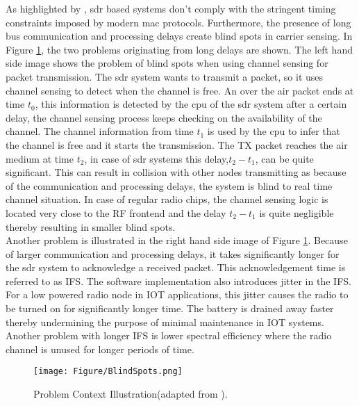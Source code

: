 As highlighted by \cite{schmid_experimental_2007}, \ac{sdr} based systems don't comply with the stringent timing constraints imposed by modern \ac{mac} protocols. Furthermore, the presence of long bus communication and processing delays create blind spots\cite{schmid_experimental_2007} in carrier sensing. 
In Figure \ref{blind_spots}, the two problems originating from long delays are shown.
The left hand side image shows the problem of blind spots when using channel sensing for packet transmission.
The \ac{sdr} system wants to transmit a packet, so it uses channel sensing to detect when the channel is free.
An over the air packet ends at time $t_0$, this information is detected by the \ac{cpu} of the \ac{sdr} system after a certain delay, the channel sensing process keeps checking on the availability of the channel.
The channel information from time $t_1$ is used by the \ac{cpu} to infer that the channel is free and it starts the transmission.
The TX packet reaches the air medium at time $t_2$, in case of \ac{sdr} systems this delay,$t_2-t_1$, can be quite significant.
This can result in collision with other nodes transmitting as because of the communication and processing delays, the system is blind to real time channel situation.
In case of regular radio chips, the channel sensing logic is located very close to the \ac{RF} frontend and the delay $t_2 - t_1$ is quite negligible thereby resulting in smaller blind spots.\\

Another problem is illustrated in the right hand side image of Figure \ref{blind_spots}.
Because of larger communication and processing delays, it takes significantly longer for the \ac{sdr} system to acknowledge a received packet.
This acknowledgement time is referred to as \ac{IFS}.
The software implementation also introduces jitter in the {IFS}.
For a low powered radio node in \ac{IOT} applications, this jitter causes the radio to be turned on for significantly longer time.
The battery is drained away faster thereby undermining the purpose of minimal maintenance in \ac{IOT} systems.
Another problem with longer \ac{IFS} is lower spectral efficiency where the radio channel is unused for longer periods of time.\\ 

\begin{figure}[!h]
\centering
\texttt{[image: Figure/BlindSpots.png]}
\caption{Problem Context Illustration(adapted from \cite{schmid_experimental_2007}).}
\label{blind_spots}
\end{figure}


